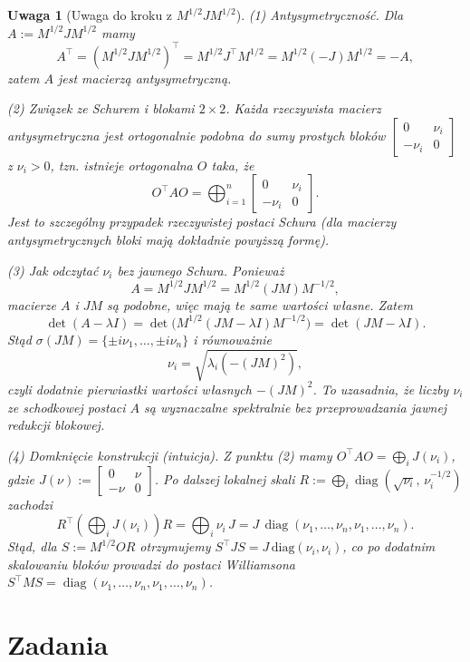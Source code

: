 \documentclass[12pt]{article}
\newtheorem{remark}{Uwaga}
\begin{document}
\begin{remark}[Uwaga do kroku z $M^{1/2}JM^{1/2}$]
(1) \emph{Antysymetryczność.} Dla $A:=M^{1/2}JM^{1/2}$ mamy
\[
A^\top=(M^{1/2}JM^{1/2})^\top=M^{1/2}J^\top M^{1/2}
= M^{1/2}(-J)M^{1/2}=-A,
\]
zatem $A$ jest macierzą antysymetryczną.

(2) \emph{Związek ze Schurem i blokami $2\times2$.} Każda rzeczywista macierz antysymetryczna
jest ortogonalnie podobna do sumy prostych bloków
$\begin{bmatrix}0&\nu_i\\ -\nu_i&0\end{bmatrix}$ z $\nu_i>0$, tzn. istnieje
ortogonalna $O$ taka, że
\[
O^\top A O=\bigoplus_{i=1}^n \begin{bmatrix}0&\nu_i\\ -\nu_i&0\end{bmatrix}.
\]
Jest to szczególny przypadek rzeczywistej postaci Schura (dla macierzy
antysymetrycznych bloki mają dokładnie powyższą formę).

(3) \emph{Jak odczytać $\nu_i$ bez jawnego Schura.} Ponieważ
\[
A=M^{1/2} J M^{1/2}=M^{1/2}(JM)M^{-1/2},
\]
macierze $A$ i $JM$ są podobne, więc mają te same wartości własne. Zatem
\[
\det(A-\lambda I)=\det\!\big(M^{1/2}(JM-\lambda I)M^{-1/2}\big)
=\det(JM-\lambda I).
\]
Stąd $\sigma(JM)=\{\pm i\nu_1,\dots,\pm i\nu_n\}$ i równoważnie
\[
\nu_i=\sqrt{\lambda_i\!\left(-(JM)^2\right)},
\]
czyli dodatnie pierwiastki wartości własnych $-(JM)^2$. To uzasadnia, że liczby $\nu_i$ ze
schodkowej postaci $A$ są wyznaczalne spektralnie bez przeprowadzania
jawnej redukcji blokowej.

(4) \emph{Domknięcie konstrukcji (intuicja).} Z punktu (2) mamy
$O^\top A O=\bigoplus_i J(\nu_i)$, gdzie $J(\nu):=\begin{bmatrix}0&\nu\\ -\nu&0\end{bmatrix}$.
Po dalszej lokalnej skali $R:=\bigoplus_i \operatorname{diag}(\sqrt{\nu_i},\,\nu_i^{-1/2})$
zachodzi
\[
R^\top\!\left(\bigoplus_i J(\nu_i)\right)R
= \bigoplus_i \nu_i\,J
= J\,\operatorname{diag}(\nu_1,\dots,\nu_n,\nu_1,\dots,\nu_n).
\]
Stąd, dla $S:=M^{1/2}OR$ otrzymujemy $S^\top J S = J\,\mathrm{diag}(\nu_i,\nu_i)$,
co po dodatnim skalowaniu bloków prowadzi do postaci
Williamsona $S^\top M S=\operatorname{diag}(\nu_1,\dots,\nu_n,\nu_1,\dots,\nu_n)$.
\end{remark}

\section*{Zadania}
\end{document}
